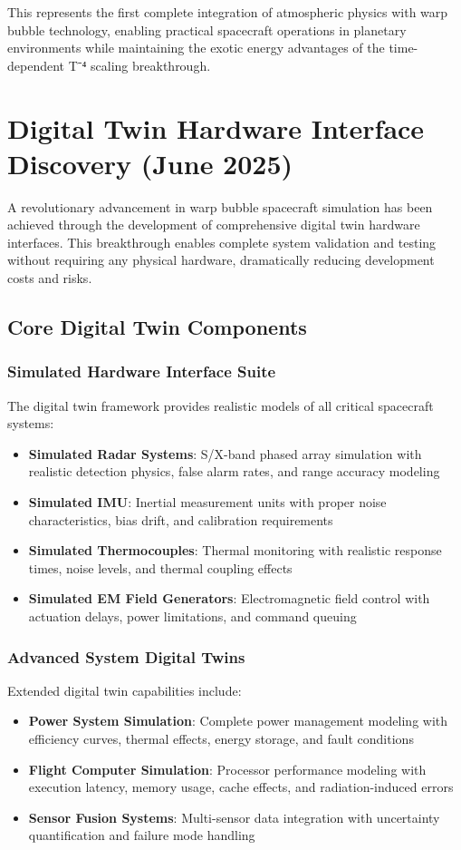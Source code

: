 \documentclass[11pt]{article}
\begin{document}
This represents the first complete integration of atmospheric physics with warp bubble technology, enabling practical spacecraft operations in planetary environments while maintaining the exotic energy advantages of the time-dependent T⁻⁴ scaling breakthrough.

\section{Digital Twin Hardware Interface Discovery (June 2025)}

A revolutionary advancement in warp bubble spacecraft simulation has been achieved through the development of comprehensive digital twin hardware interfaces. This breakthrough enables complete system validation and testing without requiring any physical hardware, dramatically reducing development costs and risks.

\subsection{Core Digital Twin Components}

\subsubsection{Simulated Hardware Interface Suite}
The digital twin framework provides realistic models of all critical spacecraft systems:
\begin{itemize}
\item \textbf{Simulated Radar Systems}: S/X-band phased array simulation with realistic detection physics, false alarm rates, and range accuracy modeling
\item \textbf{Simulated IMU}: Inertial measurement units with proper noise characteristics, bias drift, and calibration requirements
\item \textbf{Simulated Thermocouples}: Thermal monitoring with realistic response times, noise levels, and thermal coupling effects
\item \textbf{Simulated EM Field Generators}: Electromagnetic field control with actuation delays, power limitations, and command queuing
\end{itemize}

\subsubsection{Advanced System Digital Twins}
Extended digital twin capabilities include:
\begin{itemize}
\item \textbf{Power System Simulation}: Complete power management modeling with efficiency curves, thermal effects, energy storage, and fault conditions
\item \textbf{Flight Computer Simulation}: Processor performance modeling with execution latency, memory usage, cache effects, and radiation-induced errors
\item \textbf{Sensor Fusion Systems}: Multi-sensor data integration with uncertainty quantification and failure mode handling
\end{itemize}
\end{document}
